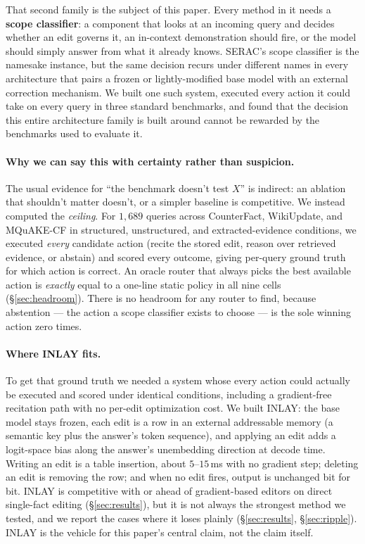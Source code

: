 \documentclass[11pt]{article}
\begin{document}
That second family is the subject of this paper. Every method in it needs a
\textbf{scope classifier}: a component that looks at an incoming query and
decides whether an edit governs it, an in-context demonstration should fire,
or the model should simply answer from what it already knows. SERAC's scope
classifier \citep{mitchell2022serac} is the namesake instance, but the same
decision recurs under different names in every architecture that pairs a
frozen or lightly-modified base model with an external correction mechanism.
We built one such system, executed every action it could take on every query
in three standard benchmarks, and found that the decision this entire
architecture family is built around cannot be rewarded by the benchmarks used
to evaluate it.

\paragraph{Why we can say this with certainty rather than suspicion.} The
usual evidence for ``the benchmark doesn't test $X$'' is indirect: an ablation
that shouldn't matter doesn't, or a simpler baseline is competitive. We
instead computed the \emph{ceiling}. For $1{,}689$ queries across
CounterFact, WikiUpdate, and MQuAKE-CF in structured, unstructured, and
extracted-evidence conditions, we executed \emph{every} candidate action
(recite the stored edit, reason over retrieved evidence, or abstain) and
scored every outcome, giving per-query ground truth for which action is
correct. An oracle router that always picks the best available action is
\emph{exactly} equal to a one-line static policy in all nine cells
(\S\ref{sec:headroom}). There is no headroom for any router to find, because
abstention --- the action a scope classifier exists to choose --- is the sole
winning action zero times.

\paragraph{Where INLAY fits.} To get that ground truth we needed a system
whose every action could actually be executed and scored under identical
conditions, including a gradient-free recitation path with no per-edit
optimization cost. We built INLAY: the base model stays frozen, each edit is
a row in an external addressable memory (a semantic key plus the answer's
token sequence), and applying an edit adds a logit-space bias along the
answer's unembedding direction at decode time. Writing an edit is a table
insertion, about $5$--$15$\,ms with no gradient step; deleting an edit is
removing the row; and when no edit fires, output is unchanged bit for bit.
INLAY is competitive with or ahead of gradient-based editors on direct
single-fact editing (\S\ref{sec:results}), but it is not always the
strongest method we tested, and we report the cases where it loses plainly
(\S\ref{sec:results}, \S\ref{sec:ripple}). INLAY is the vehicle for this
paper's central claim, not the claim itself.
\end{document}

